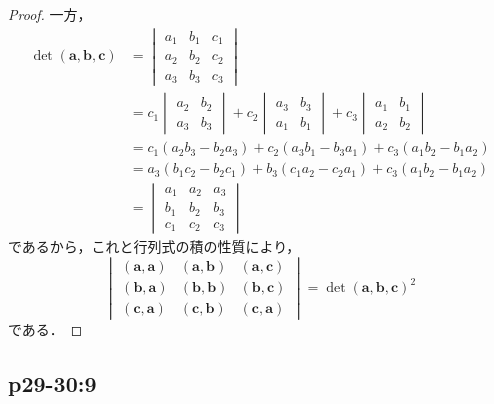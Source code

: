 \documentclass[uplatex,dvipdfmx,a4paper,10pt,fleqn]{jsarticle}
\begin{document}
\begin{tleftbar}
\begin{proof}
    一方，
    \begin{align*}
        \det (\bm{a},\bm{b},\bm{c})&=
        \begin{vmatrix}
            a_1 & b_1 & c_1 \\
            a_2 & b_2 & c_2 \\
            a_3 & b_3 & c_3
        \end{vmatrix} \\
        & = c_1
        \begin{vmatrix}
            a_2 & b_2 \\
            a_3 & b_3 
        \end{vmatrix}
        + c_2
        \begin{vmatrix}
            a_3 & b_3 \\
            a_1 & b_1
        \end{vmatrix}
        + c_3
        \begin{vmatrix}
            a_1 & b_1 \\
            a_2 & b_2
        \end{vmatrix}
        \\
        & = c_1 (a_2 b_3-b_2 a_3)+c_2 (a_3 b_1 - b_3 a_1)+c_3 (a_1 b_2 -b_1 a_2)\\
        & = a_3 (b_1 c_2 - b_2 c_1)+b_3 (c_1 a_2-c_2 a_1)+ c_3 (a_1 b_2 - b_1 a_2)\\
        & =
        \begin{vmatrix}
            a_1 & a_2 & a_3 \\
            b_1 & b_2 & b_3 \\
            c_1 & c_2 & c_3
        \end{vmatrix}
    \end{align*}
    であるから，これと行列式の積の性質により，
    \[
        \begin{vmatrix}
            (\bm{a},\bm{a}) & (\bm{a},\bm{b}) & (\bm{a},\bm{c}) \\
            (\bm{b},\bm{a}) & (\bm{b},\bm{b}) & (\bm{b},\bm{c}) \\
            (\bm{c},\bm{a}) & (\bm{c},\bm{b}) & (\bm{c},\bm{a})
        \end{vmatrix}
        = {\det (\bm{a},\bm{b},\bm{c})}^2
    \]
    である．
    \end{proof}
\end{tleftbar}


\subsection*{p29-30:9}
\end{document}
